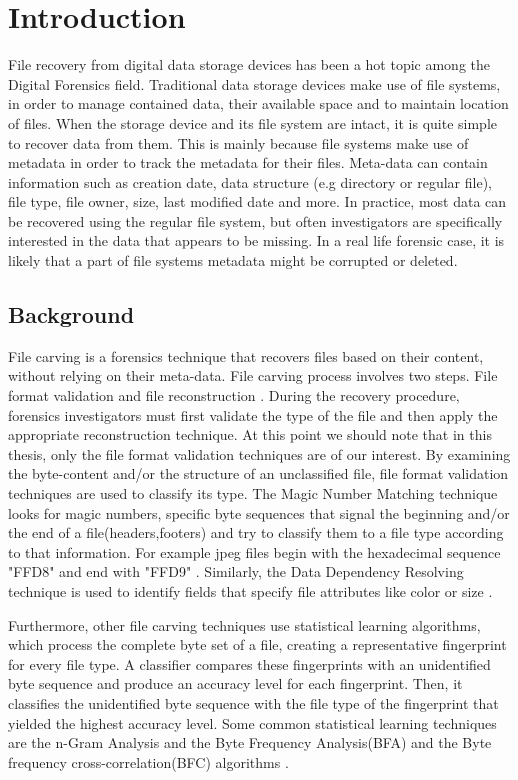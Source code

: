 \chapter{Introduction}
File recovery from digital data storage devices has been a hot topic among
the Digital Forensics field. Traditional data storage devices make use of
file systems, in order to manage contained data, their available space and to
maintain location of files. When the storage device and its file system are
intact, it is quite simple to recover data from them. This is mainly because
file systems make use of metadata in order to track the metadata for their
files. Meta-data can contain information such as creation date, data structure (e.g directory or regular file), file type, file owner, size, last modified
date and more. In practice, most data can be recovered using the regular file system, but often investigators are specifically interested in the data that appears to be missing. In a real life forensic case, it is likely that a part of file systems metadata might be corrupted or deleted. 

\section{Background}
File carving is a forensics technique that recovers files based on their content,
without relying on their meta-data. File carving process involves two steps.
File format validation and file reconstruction \cite{Aronson}. During the recovery procedure,
forensics investigators must first validate the type of the file and then apply the appropriate
reconstruction technique. At this point we should note that in this thesis, only the file format validation techniques are
of our interest.
By examining the byte-content and/or the structure of
an unclassified file, file format validation techniques are used to classify its type. The Magic Number Matching technique~\cite{Scalpel} looks for magic numbers, specific byte sequences that signal the beginning and/or the end of a file(headers,footers) and try to classify them to a file type according to that information. For example jpeg files begin with the hexadecimal sequence "FFD8" and end with "FFD9" \cite{Pal}.
Similarly, the Data Dependency Resolving technique is used to identify fields that specify file attributes like color or size \cite{Aronson}.
 
Furthermore, other file carving techniques use statistical learning algorithms, which process the complete byte set of a file, creating a representative fingerprint for
every file type. A classifier compares these fingerprints with an unidentified byte sequence and produce an accuracy level for each fingerprint. Then, it classifies the unidentified byte sequence with the file type of the fingerprint that yielded the highest accuracy level. Some common statistical learning techniques are the n-Gram Analysis \cite{ngram} and the Byte Frequency Analysis(BFA)  and the Byte frequency cross-correlation(BFC) algorithms \cite{MacDaniel}.

